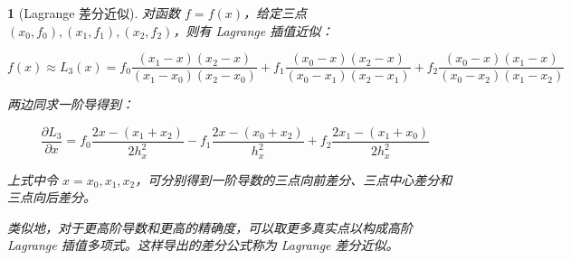 \documentclass[zihao=5,UTF8]{report}
\theoremstyle{MyTheoremStyle} %
\theoremstyle{MySubsubsectionStyle} %
\newtheorem{definition}{}
\begin{document}
\begin{definition}[Lagrange 差分近似]
对函数 $f = f(x)$，给定三点 $(x_0, f_0), (x_1, f_1), (x_2, f_2)$，则有 Lagrange 插值近似：

\begin{equation}
    f(x) \approx L_3(x) =  f_0\frac{(x_1-x)(x_2-x)}{(x_1-x_0)(x_2-x_0)}+f_1\frac{(x_0-x)(x_2-x)}{(x_0-x_1)(x_2-x_1)}+f_2\frac{(x_0-x)(x_1-x)}{(x_0-x_2)(x_1-x_2)}
\end{equation}

两边同求一阶导得到：

\begin{equation}
    \frac{\partial L_3}{\partial x}=f_{0}\frac{2x-(x_{1}+x_{2})}{2h_x^2}-f_{1}\frac{2x-(x_{0}+x_{2})}{h_x^2}+f_{2}\frac{2x_{1}-(x_{1}+x_{0})}{2h_x^2}
\end{equation}

上式中令 $x = x_0, x_1, x_2$，可分别得到一阶导数的三点向前差分、三点中心差分和三点向后差分。

类似地，对于更高阶导数和更高的精确度，可以取更多真实点以构成高阶 Lagrange 插值多项式。这样导出的差分公式称为 Lagrange 差分近似。

\end{definition}
\end{document}
